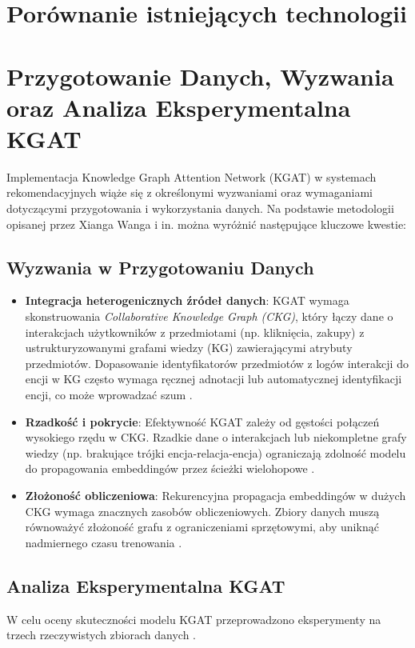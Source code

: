 \documentclass[a4paper,onecolumn]{LTJournalArticle}
\begin{document}
\section{Porównanie istniejących technologii}
\section{Przygotowanie Danych, Wyzwania oraz Analiza Eksperymentalna KGAT}

Implementacja Knowledge Graph Attention Network (KGAT) w systemach rekomendacyjnych wiąże się z określonymi wyzwaniami oraz wymaganiami dotyczącymi przygotowania i wykorzystania danych. Na podstawie metodologii opisanej przez Xianga Wanga i in. \cite{wang2019kgat} można wyróżnić następujące kluczowe kwestie:

\subsection{Wyzwania w Przygotowaniu Danych}
\begin{itemize}
    \item \textbf{Integracja heterogenicznych źródeł danych}: KGAT wymaga skonstruowania \textit{Collaborative Knowledge Graph 
	(CKG)}, który łączy dane o interakcjach użytkowników z przedmiotami (np. kliknięcia, zakupy) z ustrukturyzowanymi grafami 
	wiedzy (KG) zawierającymi atrybuty przedmiotów. Dopasowanie identyfikatorów przedmiotów z logów interakcji do encji w KG 
	często wymaga ręcznej adnotacji lub automatycznej identyfikacji encji, co może wprowadzać szum \cite{wang2019kgat}.

    \item \textbf{Rzadkość i pokrycie}: Efektywność KGAT zależy od gęstości połączeń wysokiego rzędu w CKG. Rzadkie \cite{he2017neural} dane o 
	interakcjach lub niekompletne grafy wiedzy (np. brakujące trójki encja-relacja-encja) ograniczają zdolność modelu do 
	propagowania embeddingów przez ścieżki wielohopowe \cite{he2018nais}.
    
    \item \textbf{Złożoność obliczeniowa}: Rekurencyjna propagacja embeddingów w dużych CKG wymaga znacznych zasobów 
	obliczeniowych. Zbiory danych muszą równoważyć złożoność grafu z ograniczeniami sprzętowymi, aby uniknąć nadmiernego czasu 
	trenowania \cite{wang2019kgat}.
\end{itemize}

\subsection{Analiza Eksperymentalna KGAT}
W celu oceny skuteczności modelu KGAT przeprowadzono eksperymenty na trzech rzeczywistych zbiorach danych \cite{wang2019kgat}.
\end{document}
